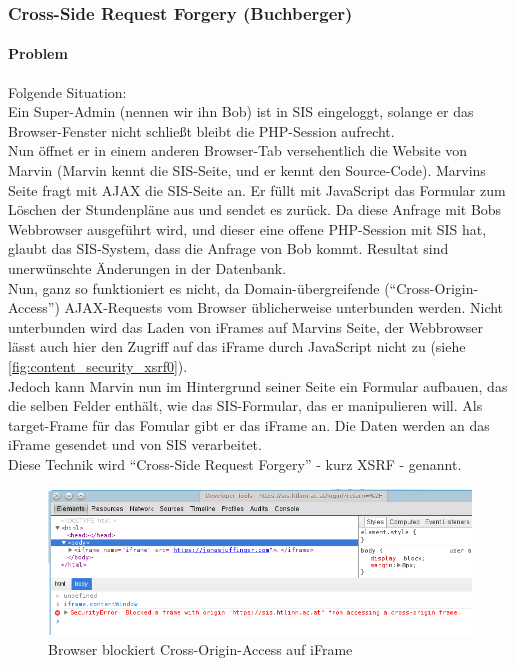 \subsubsection{Cross-Side Request Forgery (Buchberger)}
\label{sec:content_security_xsrf}
\paragraph{Problem}
Folgende Situation:\\
Ein Super-Admin (nennen wir ihn Bob) ist in SIS eingeloggt, solange er das Browser-Fenster nicht schließt bleibt die PHP-Session aufrecht. \\
Nun öffnet er in einem anderen Browser-Tab versehentlich die Website von Marvin (Marvin kennt die SIS-Seite, und er kennt den Source-Code). Marvins Seite fragt mit AJAX die SIS-Seite an. Er füllt mit JavaScript das Formular zum Löschen der Stundenpläne aus und sendet es zurück. Da diese Anfrage mit Bobs Webbrowser ausgeführt wird, und dieser eine offene PHP-Session mit SIS hat, glaubt das SIS-System, dass die Anfrage von Bob kommt. Resultat sind unerwünschte Änderungen in der Datenbank.\\
Nun, ganz so funktioniert es nicht, da Domain-übergreifende (\enquote{Cross-Origin-Access}) AJAX-Requests vom Browser üblicherweise unterbunden werden. Nicht unterbunden wird das Laden von iFrames auf Marvins Seite, der Webbrowser lässt auch hier den Zugriff auf das iFrame durch JavaScript nicht zu (siehe \autoref{fig:content_security_xsrf0}).\\
Jedoch kann Marvin nun im Hintergrund seiner Seite ein Formular aufbauen, das die selben Felder enthält, wie das SIS-Formular, das er manipulieren will. Als target-Frame für das Fomular gibt er das iFrame an. Die Daten werden an das iFrame gesendet und von SIS verarbeitet.\\
Diese Technik wird \enquote{Cross-Side Request Forgery} - kurz XSRF - genannt.

\begin{figure}[H]
\centering
\includegraphics[keepaspectratio=true, width=14cm]{images/screenshots/xsrf0.png}
\caption{Browser blockiert Cross-Origin-Access auf iFrame}
\label{fig:content_security_xsrf0}
\end{figure}
